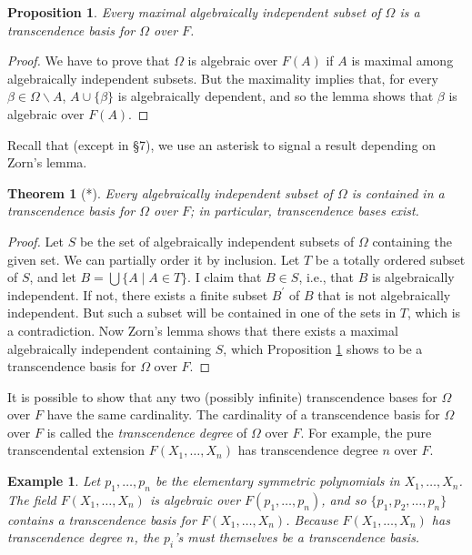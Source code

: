 \documentclass[a4paper,11pt,final,openany]{memoir}
\newtheorem{proposition}[X]{Proposition}
\newtheorem{theorem}[X]{Theorem}
\newtheorem{example}[X]{Example}
\theoremstyle{nonumberplain}
\newtheorem{proof}{Proof.}
\begin{document}
\begin{proposition}
\label{te12}Every maximal algebraically independent subset of $\Omega$ is a
transcendence basis for $\Omega$ over $F$.
\end{proposition}

\begin{proof}
We have to prove that $\Omega$ is algebraic over $F(A)$ if $A$ is maximal
among algebraically independent subsets. But the maximality implies that, for
every $\beta\in\Omega\smallsetminus A$, $A\cup\{\beta\}$ is algebraically
dependent, and so the lemma shows that $\beta$ is algebraic over $F(A)$.
\end{proof}

Recall that (except in \S 7), we use an asterisk to signal a result depending
on Zorn's lemma.

\begin{theorem}
[*]\label{te13}Every algebraically independent subset of $\Omega$ is contained
in a transcendence basis for $\Omega$ over $F$; in particular, transcendence
bases exist.
\end{theorem}

\begin{proof}
Let $S$ be the set of algebraically independent subsets of $\Omega$ containing
the given set. We can partially order it by inclusion. Let $T$ be a totally
ordered subset of $S$, and let $B=\bigcup\{A\mid A\in T\}$. I claim that $B\in
S$, i.e., that $B$ is algebraically independent. If not, there exists a finite
subset $B^{\prime}$ of $B$ that is not algebraically independent. But such a
subset will be contained in one of the sets in $T$, which is a contradiction.
Now Zorn's lemma shows that there exists a maximal algebraically independent
containing $S$, which Proposition \ref{te12} shows to be a transcendence basis
for $\Omega$ over $F$.
\end{proof}

It is possible to show that any two (possibly infinite) transcendence bases
for $\Omega$ over $F$ have the same cardinality. The cardinality of a
transcendence basis for $\Omega$ over $F$ is called the%
\emph{transcendence degree\/} of $\Omega$ over $F$. For example, the pure
transcendental extension $F(X_{1},\ldots,X_{n})$ has transcendence degree $n$
over $F$.

\begin{example}
\label{te9}Let $p_{1},\ldots,p_{n}$ be the elementary symmetric polynomials in
$X_{1},\ldots,X_{n}$. The field $F(X_{1},\ldots,X_{n})$ is algebraic over
$F(p_{1},\ldots,p_{n})$, and so $\{p_{1},p_{2},\ldots,p_{n}\}$ contains a
transcendence basis for $F(X_{1},\ldots,X_{n})$. Because $F(X_{1},\ldots
,X_{n})$ has transcendence degree $n$, the $p_{i}$'s must themselves be a
transcendence basis.
\end{example}
\end{document}
